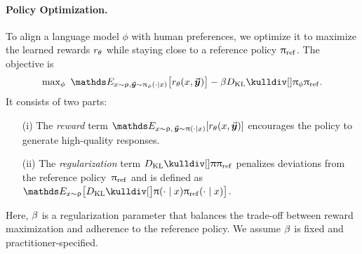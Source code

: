    \paragraph{Policy Optimization.} To align a language model $\phi$ with human preferences, we optimize it to maximize the learned rewards $r_{\theta}$ while staying close to a reference policy $\uppi_{{\rm ref}}$. The objective is
	\begin{equation}\label{eq:policy_loss_with_rm}
    \max\nolimits_{{\phi}} \ 
    \Exp_{\prompt \sim \promptdistr, \response \sim \policy_{\phi}(\cdot \mid \prompt)}
    \big[ \rewardtheta (\context, \response) \big]
    - \parabeta \kull{\policy_{\phi}}{\policyref}.
\end{equation}
	It consists of two parts: 
    \begin{itemize}
	\item[(i)] The \emph{reward} term $\Exp_{\prompt \sim \promptdistr, \, \response \sim \policy(\cdot \mid \prompt)} [ \rewardtheta(\context, \response) ]$ encourages the policy to generate high-quality responses.
	\item[(ii)] The \emph{regularization} term \mbox{$\kull{\policy}{\policyref}$} penalizes deviations from the reference policy~$\uppi_{{\rm ref}}$ and is defined as \mbox{$\Exp_{\prompt \sim \promptdistr} \big[ \kull[\big]{\policy(\cdot \mid \prompt)}{\policyref(\cdot \mid \prompt)} \big]$}.
    \end{itemize}
    Here, $\beta$ is a regularization parameter that balances the trade-off between reward maximization and adherence to the reference policy. 
    We assume $\beta$ is fixed and practitioner-specified.


    

